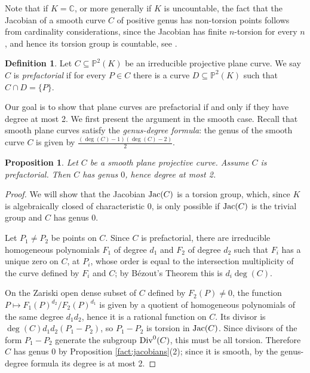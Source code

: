 \documentclass{amsart}
\theoremstyle{plain}
\newtheorem{prop}[thm]{Proposition}
\theoremstyle{definition}
\newtheorem{defn}[thm]{Definition}
\newcommand{\Jac}{\textnormal{Jac}}
\newcommand{\Div}{\textnormal{Div}}
\begin{document}
Note that if $K=\mathbb{C}$, or more generally if $K$ is uncountable, the fact that the Jacobian of a smooth curve $C$ of positive genus has non-torsion points follows from cardinality considerations, since the Jacobian has finite $n$-torsion for every $n$, and hence its torsion group is countable, see \cite[Theorem A.7.2.7]{HS}.

\begin{defn}
	Let $C \subseteq \mathbb{P}^2(K)$ be an irreducible projective plane curve. We say $C$ is \emph{prefactorial} if for every $P \in C$ there is a curve $D \subseteq \mathbb{P}^2(K)$ such that $C \cap D=\{P\}$.
\end{defn}

Our goal is to show that plane curves are prefactorial if and only if they have degree at most 2. We first present the argument in the smooth case. Recall that smooth plane curves satisfy the \emph{genus-degree formula}: the genus of the smooth curve $C$ is given by $\frac{(\deg(C)-1)(\deg(C)-2)}{2}$.

\begin{prop}\label{prop:if-smooth-pref-then-deg}
	Let $C$ be a smooth plane projective curve. Assume $C$ is prefactorial. Then $C$ has genus $0$, hence degree at most 2.
\end{prop}

\begin{proof}
	We will show that the Jacobian $\Jac(C)$ is a torsion group, which, since $K$ is algebraically closed of characteristic $0$, is only possible if $\Jac(C)$ is the trivial group and $C$ has genus $0$. 
	
	Let $P_1 \neq P_2$ be points on $C$. Since $C$ is prefactorial, there are irreducible homogeneous polynomials $F_1$ of degree $d_1$ and $F_2$ of degree $d_2$ such that $F_i$ has a unique zero on $C$, at $P_i$, whose order is equal to the intersection multiplicity of the curve defined by $F_i$ and $C$; by B\'ezout's Theorem \cite[Theorem A.4.6.1]{HS} this is $d_i \deg(C)$.
	
	On the Zariski open dense subset of $C$ defined by $F_2(P) \neq 0$, the function $P \mapsto F_1(P)^{d_2}/F_2(P)^{d_1}$ is given by a quotient of homogeneous polynomials of the same degree $d_1d_2$, hence it is a rational function on $C$. Its divisor  is $\deg(C)d_1d_2(P_1-P_2)$, so $P_1-P_2$ is torsion in $\Jac(C)$. Since divisors of the form $P_1-P_2$ generate the subgroup $\Div^0(C)$, this must be all torsion. Therefore $C$ has genus $0$ by Proposition \ref{fact:jacobians}(2); since it is smooth, by the genus-degree formula its degree is at most 2.
\end{proof}
\end{document}
